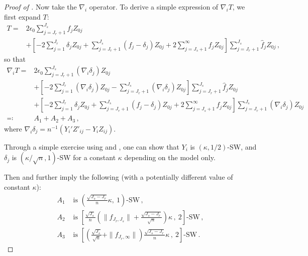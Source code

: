 \documentclass[11pt]{article}
\theoremstyle{plain}
\begin{document}
\begin{proof}[Proof of ]
Now take the $\nabla_i$ operator. To derive a simple expression of $\nabla_i T$, we first expand $T$:
\begin{align*}
  T = & 2\epsilon_0\sum_{j=J_r+1}^{J_s}\hat f_j Z_{0j}\\
  &+\left[-2\sum_{j=1}^{J_r}\delta_j Z_{0j}+\sum_{j=J_r+1}^{J_s}( f_j-\delta_j) Z_{0j}+2\sum_{j=J_s+1}^\infty  f_j Z_{0j}\right]\sum_{j=J_r+1}^{J_s}\hat f_j Z_{0j}\,,\end{align*}
  so that \begin{align*}
  \nabla_i T = & 2\epsilon_0\sum_{j=J_r+1}^{J_s}(\nabla_i \delta_j) Z_{0j}\\
 &+\left[-2\sum_{j=1}^{J_r}(\nabla_i\delta_j) Z_{0j}-\sum_{j=J_r+1}^{J_s}(\nabla_i\delta_j) Z_{0j}\right]\sum_{j=J_r+1}^{J_s}\hat f_j Z_{0j}\\
 &+\left[-2\sum_{j=1}^{J_r}\delta_j Z_{0j}+\sum_{j=J_r+1}^{J_s}( f_j-\delta_j) Z_{0j}+2\sum_{j=J_s+1}^\infty  f_j Z_{0j}\right]\sum_{j=J_r+1}^{J_s}(\nabla_i\delta_j) Z_{0j}\\
\eqqcolon& A_1+A_2+A_3\,,
\end{align*}
where $\nabla_i\delta_j=n^{-1}(Y_i' Z'_{ij}-Y_i Z_{ij})$.

Through a simple exercise using  and , one can show that $Y_i$ is $(\kappa,1/2)$-SW, and $\delta_j$ is $(\kappa/\sqrt{n},1)$-SW for a constant $\kappa$ depending on the model only.

Then  and  further imply the following (with a potentially different value of constant $\kappa$):
\begin{align} A_1 & \text{ is } \left(\frac{\sqrt{J_s-J_r}}{n}\kappa,~1\right)\text{-SW}\,,\label{eq:6.3-A1}\\
   A_2 & \text{ is } \left[\frac{\sqrt{J_s}}{n}\left(\| f_{J_r,J_s}\|+\frac{\sqrt{J_s-J_r}}{\sqrt{n}}\right)\kappa\,,~2\right]\text{-SW}\,,\label{eq:6.3-A2}\\
   A_3 & \text{ is } \left[\left(\frac{\sqrt{J_s}}{\sqrt{n}}+\| f_{J_r,\infty}\|\right)\frac{\sqrt{J_s-J_r}}{n}\kappa\,,~2\right]\text{-SW}\,.\label{eq:6.3-A3}
\end{align}



\end{proof}
\end{document}
